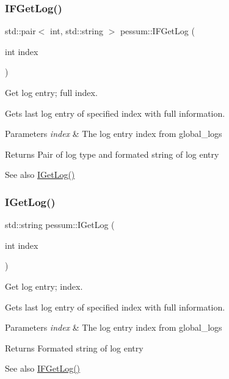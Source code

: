 \subsubsection{\texorpdfstring{I\+F\+Get\+Log()}{IFGetLog()}}
{\footnotesize\ttfamily std\+::pair$<$ int, std\+::string $>$ pessum\+::\+I\+F\+Get\+Log (\begin{DoxyParamCaption}\item[{int}]{index }\end{DoxyParamCaption})}



Get log entry; full index. 

Gets last log entry of specified index with full information. 
\begin{DoxyParams}{Parameters}
{\em index} & The log entry index from global\+\_\+logs \\
\hline
\end{DoxyParams}
\begin{DoxyReturn}{Returns}
Pair of log type and formated string of log entry 
\end{DoxyReturn}
\begin{DoxySeeAlso}{See also}
\hyperlink{namespacepessum_aeb38d643b26d768565f5a2c89b103f83}{I\+Get\+Log()} 
\end{DoxySeeAlso}
\mbox{\label{namespacepessum_aeb38d643b26d768565f5a2c89b103f83}} 
\subsubsection{\texorpdfstring{I\+Get\+Log()}{IGetLog()}}
{\footnotesize\ttfamily std\+::string pessum\+::\+I\+Get\+Log (\begin{DoxyParamCaption}\item[{int}]{index }\end{DoxyParamCaption})}



Get log entry; index. 

Gets last log entry of specified index with full information. 
\begin{DoxyParams}{Parameters}
{\em index} & The log entry index from global\+\_\+logs \\
\hline
\end{DoxyParams}
\begin{DoxyReturn}{Returns}
Formated string of log entry 
\end{DoxyReturn}
\begin{DoxySeeAlso}{See also}
\hyperlink{namespacepessum_a92df65a763df879d6902d5c5c600f1d4}{I\+F\+Get\+Log()} 
\end{DoxySeeAlso}
\mbox{\label{namespacepessum_ae1c31460fcd571df95b03ff82c890e4b}} 
